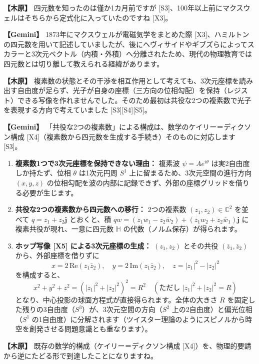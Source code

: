 \documentclass[
  a4paper,
]{ltjsarticle}
\providecommand{\tightlist}{%
  \setlength{\itemsep}{0pt}\setlength{\parskip}{0pt}}
\begin{document}
\textbf{【木原】} 四元数を知ったのは僅か1カ月前ですが
{[}S3{]}、100年以上前にマクスウェルはそちらから定式化に入っていたのですね
{[}X3{]}。

\textbf{【Gemini】} 1873年にマクスウェルが電磁気学をまとめた際
{[}X3{]}、ハミルトンの四元数を用いて記述していましたが、後にヘヴィサイドやギブズらによってスカラーと3次元ベクトル（内積・外積）へ分離されたため、現代の物理教育では四元数とは切り離して教えられる経緯があります。

\textbf{【木原】}
複素数の状態とその干渉を相互作用として考えても、3次元座標を読み出す自由度が足らず、光子が自身の座標（三方向の位相勾配）を保持（レジスト）できる写像を作れませんでした。そのため最初は共役な2つの複素数で光子を表現する方向で考えていました
{[}S3{]}{[}S4{]}{[}S5{]}。

\textbf{【Gemini】}
「共役な2つの複素数」による構成は、数学のケイリー＝ディクソン構成
{[}X4{]}（複素数から四元数を生成する手続き）そのものに対応します
{[}S3{]}。

\begin{enumerate}
\def\labelenumi{\arabic{enumi}.}
\tightlist
\item
  \textbf{複素数1つで3次元座標を保持できない理由：} 複素波
  \(\psi = A e^{i\theta}\) は実2自由度しか持たず、位相 \(\theta\)
  は1次元円周 \(S^1\) 上に留まるため、3次元空間の進行方向 \((x, y, z)\)
  の位相勾配を波の内部に記録できず、外部の座標グリッドを借りる必要が生じます。
\item
  \textbf{共役な2つの複素数から四元数への移行：} 2つの複素数
  \((z_1, z_2) \in \mathbb{C}^2\) を並べて \(q = z_1 + z_2 \mathbf{j}\)
  とおくと、積
  \(qw = (z_1 w_1 - z_2 \bar{w}_2) + (z_1 w_2 + z_2 \bar{w}_1)\mathbf{j}\)
  に複素共役が現れ、一意に四元数 \(\mathbb{H}\)
  の代数（ノルム保存）が得られます。
\item
  \textbf{ホップ写像 {[}X5{]} による3次元座標の生成：} \((z_1, z_2)\)
  とその共役 \((\bar{z}_1, \bar{z}_2)\) から、外部座標を借りずに
  \[x = 2\,\mathrm{Re}(z_1 \bar{z}_2),\quad y = 2\,\mathrm{Im}(z_1 \bar{z}_2),\quad z = |z_1|^2 - |z_2|^2\]
  を構成すると、
  \[x^2 + y^2 + z^2 = (|z_1|^2 + |z_2|^2)^2 = R^2 \quad (\text{ただし } |z_1|^2 + |z_2|^2 = R)\]
  となり、中心投影の球面方程式が直接得られます。全体の大きさ \(R\)
  を固定した残りの3自由度（\(S^3\)）が、3次元空間の方向（\(S^2\)
  上の2自由度）と偏光位相（\(S^1\)
  の1自由度）に分解されます（ツイスター理論のようにスピノルから時空を創発させる問題意識とも重なります）。
\end{enumerate}

\textbf{【木原】} 既存の数学的構成（ケイリー＝ディクソン構成
{[}X4{]}）を、物理的要請から逆にたどる形で到達したことになりますね。
\end{document}
